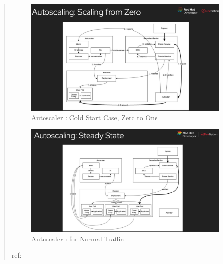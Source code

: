 \documentclass{article}
\begin{document}
\begin{quote}
    \begin{figure}[h]
    \centering
    \includegraphics[width=0.5\linewidth]
    {images/KnativeAutoscaler-1.PNG}
    \caption{Autoscaler : Cold Start Case, Zero to One}
\end{figure}
\begin{figure}[h]
    \centering
    \includegraphics[width=0.5\linewidth]{images/KnativeAutoscaler-2.PNG}
    \caption{Autoscaler : for Normal Traffic }
\end{figure}
\begin{flushright} ref: \textit{\cite{Morie_2020}} \end{flushright}
\end{quote}
\pagebreak
\end{document}
